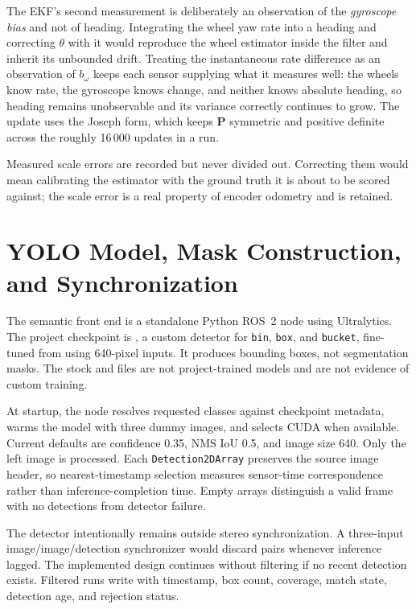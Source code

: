 The EKF's second measurement is deliberately an observation of the \emph{gyroscope
bias} and not of heading. Integrating the wheel yaw rate into a heading and
correcting $\theta$ with it would reproduce the wheel estimator inside the filter
and inherit its unbounded drift. Treating the instantaneous rate difference as an
observation of $b_\omega$ keeps each sensor supplying what it measures well: the
wheels know rate, the gyroscope knows change, and neither knows absolute heading,
so heading remains unobservable and its variance correctly continues to grow. The
update uses the Joseph form, which keeps $\mathbf{P}$ symmetric and positive
definite across the roughly 16\,000 updates in a run.

Measured scale errors are recorded but never divided out. Correcting them would
mean calibrating the estimator with the ground truth it is about to be scored
against; the scale error is a real property of encoder odometry and is retained.

\section{YOLO Model, Mask Construction, and Synchronization}
\label{sec:yolo-method}

The semantic front end is a standalone Python ROS~2 node using Ultralytics. The
project checkpoint is , a custom detector for \texttt{bin},
\texttt{box}, and \texttt{bucket}, fine-tuned from  using
640-pixel inputs. It produces bounding boxes, not segmentation masks. The stock
 and  files are not project-trained models and
are not evidence of custom training.

At startup, the node resolves requested classes against checkpoint metadata,
warms the model with three dummy images, and selects CUDA when available. Current
defaults are confidence 0.35, NMS IoU 0.5, and image size 640. Only the left image
is processed. Each \texttt{Detection2DArray} preserves the source image header,
so nearest-timestamp selection measures sensor-time correspondence rather than
inference-completion time. Empty arrays distinguish a valid frame with no
detections from detector failure.

The detector intentionally remains outside stereo synchronization. A three-input
image/image/detection synchronizer would discard pairs whenever inference lagged.
The implemented design continues without filtering if no recent detection exists.
Filtered runs write  with timestamp, box count, coverage,
match state, detection age, and rejection status.

